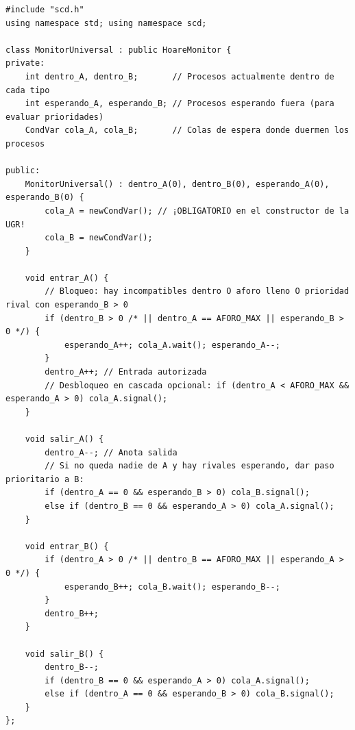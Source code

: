 \documentclass[11pt,a4paper]{article}
\begin{document}
\begin{lstlisting}
#include "scd.h"
using namespace std; using namespace scd;

class MonitorUniversal : public HoareMonitor {
private:
    int dentro_A, dentro_B;       // Procesos actualmente dentro de cada tipo
    int esperando_A, esperando_B; // Procesos esperando fuera (para evaluar prioridades)
    CondVar cola_A, cola_B;       // Colas de espera donde duermen los procesos

public:
    MonitorUniversal() : dentro_A(0), dentro_B(0), esperando_A(0), esperando_B(0) {
        cola_A = newCondVar(); // ¡OBLIGATORIO en el constructor de la UGR!
        cola_B = newCondVar();
    }

    void entrar_A() {
        // Bloqueo: hay incompatibles dentro O aforo lleno O prioridad rival con esperando_B > 0
        if (dentro_B > 0 /* || dentro_A == AFORO_MAX || esperando_B > 0 */) {
            esperando_A++; cola_A.wait(); esperando_A--;
        }
        dentro_A++; // Entrada autorizada
        // Desbloqueo en cascada opcional: if (dentro_A < AFORO_MAX && esperando_A > 0) cola_A.signal();
    }

    void salir_A() {
        dentro_A--; // Anota salida
        // Si no queda nadie de A y hay rivales esperando, dar paso prioritario a B:
        if (dentro_A == 0 && esperando_B > 0) cola_B.signal();
        else if (dentro_B == 0 && esperando_A > 0) cola_A.signal();
    }

    void entrar_B() {
        if (dentro_A > 0 /* || dentro_B == AFORO_MAX || esperando_A > 0 */) {
            esperando_B++; cola_B.wait(); esperando_B--;
        }
        dentro_B++;
    }

    void salir_B() {
        dentro_B--;
        if (dentro_B == 0 && esperando_A > 0) cola_A.signal();
        else if (dentro_A == 0 && esperando_B > 0) cola_B.signal();
    }
};
\end{lstlisting}

\vspace{-0.15cm}
\end{document}
